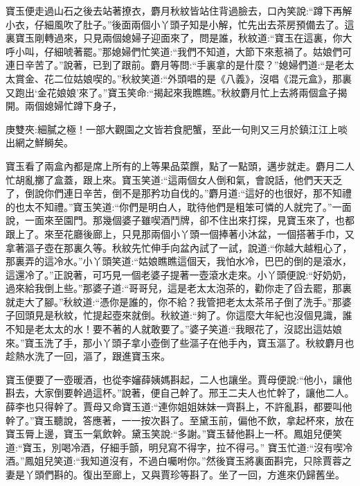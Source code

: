 \begin{parag}
    寶玉便走過山石之後去站著撩衣，麝月秋紋皆站住背過臉去，口內笑說:“蹲下再解小衣，仔細風吹了肚子。”後面兩個小丫頭子知是小解，忙先出去茶房預備去了。這裏寶玉剛轉過來，只見兩個媳婦子迎面來了，問是誰，秋紋道:“寶玉在這裏，你大呼小叫，仔細唬著罷。”那媳婦們忙笑道:“我們不知道，大節下來惹禍了。姑娘們可連日辛苦了。”說著，已到了跟前。麝月等問:“手裏拿的是什麼？”媳婦們道:“是老太太賞金、花二位姑娘喫的。”秋紋笑道:“外頭唱的是《八義》，沒唱《混元盒》，那裏又跑出‘金花娘娘’來了。”寶玉笑命:“揭起來我瞧瞧。”秋紋麝月忙上去將兩個盒子揭開。兩個媳婦忙蹲下身子，\begin{note}庚雙夾:細膩之極！一部大觀園之文皆若食肥蟹，至此一句則又三月於鎮江江上啖出網之鮮鰣矣。\end{note}寶玉看了兩盒內都是席上所有的上等果品菜饌，點了一點頭，邁步就走。麝月二人忙胡亂擲了盒蓋，跟上來。寶玉笑道:“這兩個女人倒和氣，會說話，他們天天乏了，倒說你們連日辛苦，倒不是那矜功自伐的。”麝月道:“這好的也很好，那不知禮的也太不知禮。”寶玉笑道:“你們是明白人，耽待他們是粗笨可憐的人就完了。”一面說，一面來至園門。那幾個婆子雖喫酒鬥牌，卻不住出來打探，見寶玉來了，也都跟上了。來至花廳後廊上，只見那兩個小丫頭一個捧著小沐盆，一個搭著手巾，又拿著漚子壺在那裏久等。秋紋先忙伸手向盆內試了一試，說道:“你越大越粗心了，那裏弄的這冷水。”小丫頭笑道:“姑娘瞧瞧這個天，我怕水冷，巴巴的倒的是滾水，這還冷了。”正說著，可巧見一個老婆子提著一壺滾水走來。小丫頭便說:“好奶奶，過來給我倒上些。”那婆子道:“哥哥兒，這是老太太泡茶的，勸你走了舀去罷，那裏就走大了腳。”秋紋道:“憑你是誰的，你不給？我管把老太太茶吊子倒了洗手。”那婆子回頭見是秋紋，忙提起壺來就倒。秋紋道:“夠了。你這麼大年紀也沒個見識，誰不知是老太太的水！要不著的人就敢要了。”婆子笑道:“我眼花了，沒認出這姑娘來。”寶玉洗了手，那小丫頭子拿小壺倒了些漚子在他手內，寶玉漚了。秋紋麝月也趁熱水洗了一回，漚了，跟進寶玉來。
\end{parag}


\begin{parag}
    寶玉便要了一壺暖酒，也從李嬸薛姨媽斟起，二人也讓坐。賈母便說:“他小，讓他斟去，大家倒要幹過這杯。”說著，便自己幹了。邢王二夫人也忙幹了，讓他二人。薛李也只得幹了。賈母又命寶玉道:“連你姐姐妹妹一齊斟上，不許亂斟，都要叫他幹了。”寶玉聽說，答應著，一一按次斟了。至黛玉前，偏他不飲，拿起杯來，放在寶玉脣上邊，寶玉一氣飲幹。黛玉笑說:“多謝。”寶玉替他斟上一杯。鳳姐兒便笑道:“寶玉，別喝冷酒，仔細手顫，明兒寫不得字，拉不得弓。” 寶玉忙道:“沒有喫冷酒。”鳳姐兒笑道:“我知道沒有，不過白囑咐你。”然後寶玉將裏面斟完，只除賈蓉之妻是丫頭們斟的。復出至廊上，又與賈珍等斟了。坐了一回，方進來仍歸舊坐。
\end{parag}


